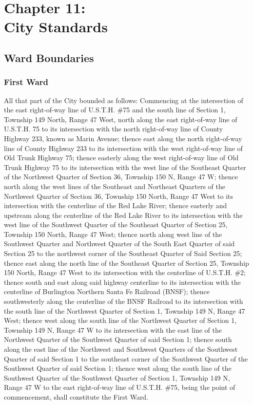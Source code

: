 \chapter*{Chapter 11: \\
	City Standards}
    \vfill
    \minitoc
    \pagebreak
    
\section{Ward Boundaries}
\subsection{First Ward}
All that part of the City bounded as follows:  Commencing at the intersection of the east right-of-way line of U.S.T.H. \#75 and the south line of Section 1, Township 149 North, Range 47 West, north along the east right-of-way line of U.S.T.H. 75 to its intersection with the north right-of-way line of County Highway 233, known as Marin Avenue; thence east along the north right-of-way line of County Highway 233 to its intersection with the west right-of-way line of Old Trunk Highway 75; thence easterly along the west right-of-way line of Old Trunk Highway 75 to its intersection with the west line of the Southeast Quarter of the Northwest Quarter of Section 36, Township 150 N, Range 47 W; thence north along the west lines of the Southeast and Northeast Quarters of the Northwest Quarter of Section 36, Township 150 North, Range 47 West to its intersection with the centerline of the Red Lake River; thence easterly and  upstream along the centerline of the Red Lake River to its intersection with the west line of the Southwest Quarter of the Southeast Quarter  of Section 25, Township 150 North, Range 47 West; thence north along west line of the Southwest Quarter and Northwest Quarter of the South East Quarter of said Section 25 to the northwest corner of the Southeast Quarter of Said Section 25; thence east along the north line of the Southeast Quarter of Section 25, Township 150 North, Range 47 West to its intersection with the centerline of U.S.T.H. \#2; thence south and east along said highway centerline to its intersection with the centerline of Burlington Northern Santa Fe Railroad (BNSF); thence southwesterly along the centerline of the BNSF Railroad to its intersection with the south line of the Northwest Quarter of Section 1, Township 149 N, Range 47 West; thence west along the south line of the Northwest Quarter of Section 1, Township 149 N, Range 47 W to its intersection with the east line of the Northwest Quarter of the Southwest Quarter of  said Section 1; thence south along the east line of the Northwest and Southwest Quarters of the Southwest Quarter of said Section 1 to the southeast corner of the Southwest Quarter of the Southwest Quarter of  said Section 1; thence west along the south line of the Southwest Quarter of the Southwest Quarter of Section 1, Township 149 N, Range 47 W to the east right-of-way line of U.S.T.H. \#75, being the point of commencement, shall constitute the First Ward.

